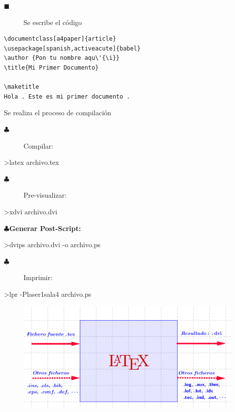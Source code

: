 \begin{description}
\item[$\blacksquare$] Se escribe el c\'{o}digo\end{description}
\begin{verbatim}
\documentclass[a4paper]{article}
\usepackage[spanish,activeacute]{babel}
\author {Pon tu nombre aqu\'{\i}}
\title{Mi Primer Documento}

\maketitle
Hola . Este es mi primer documento .

\end{verbatim}

\begin{description}
\item[$\blacksquare$] Se realiza el proceso de compilaci\'{o}n

\begin{description}
\item[$\clubsuit$] Compilar:
\end{description}

\item >latex archivo.tex

\begin{description}
\item[$\clubsuit$] Pre-visualizar:
\end{description}

\item >xdvi archivo.dvi
\end{description}

$\clubsuit$\textbf{Generar Post-Script:}

\begin{description}
\item >dvips archivo.dvi -o archivo.ps

\begin{description}
\item[$\clubsuit$] Imprimir:
\end{description}

\item >lpr -Plaser1sala4 archivo.ps
\end{description}
\begin{figure}
\includegraphics[scale=0.6]{diagrama.png}
\end{figure}

